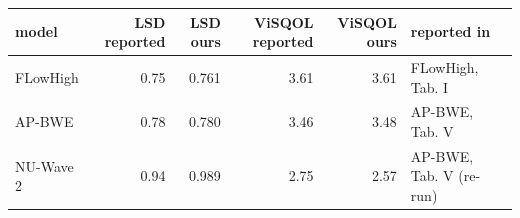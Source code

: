 \begin{tabular}{lrrrrl}
\toprule
model & LSD reported & LSD ours & ViSQOL reported & ViSQOL ours & reported in \\
\midrule
FLowHigh & 0.75 & 0.761 & 3.61 & 3.61 & FLowHigh, Tab. I \\
AP-BWE & 0.78 & 0.780 & 3.46 & 3.48 & AP-BWE, Tab. V \\
NU-Wave 2 & 0.94 & 0.989 & 2.75 & 2.57 & AP-BWE, Tab. V (re-run) \\
\bottomrule
\end{tabular}
